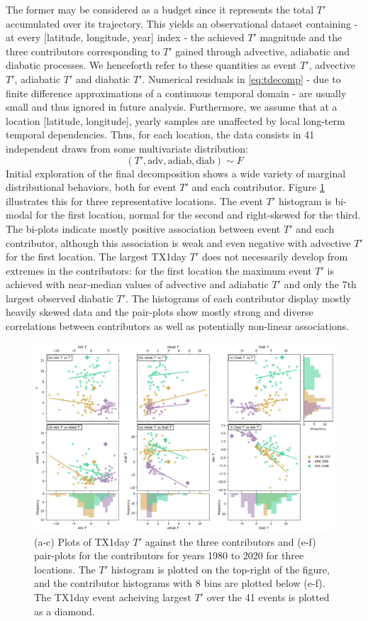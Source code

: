 \documentclass[11pt,a4paper,twoside,openright]{report}
\theoremstyle{definition}
\begin{document}
The former may be considered as a budget since it represents the total \(T'\) accumulated over its trajectory. This yields an observational dataset containing - at every {[}latitude, longitude, year{]} index - the achieved \(T'\) magnitude and the three contributors corresponding to \(T'\) gained through advective, adiabatic and diabatic processes. We henceforth refer to these quantities as event \(T'\), advective \(T'\), adiabatic \(T'\) and diabatic \(T'\). Numerical residuals in \eqref{eq:tdecomp} - due to finite difference approximations of a continuous temporal domain - are usually small and thus ignored in future analysis. Furthermore, we assume that at a location {[}latitude, longitude{]}, yearly samples are unaffected by local long-term temporal dependencies. Thus, for each location, the data consists in 41 independent draws from some multivariate distribution:
\[(T',\text{adv},\text{adiab},\text{diab}) \sim F \]
Initial exploration of the final decomposition shows a wide variety of marginal distributional behaviors, both for event \(T'\) and each contributor. Figure \ref{fig:flatdata} illustrates this for three representative locations. The event \(T'\) histogram is bi-modal for the first location, normal for the second and right-skewed for the third. The bi-plots indicate mostly positive association between event \(T'\) and each contributor, although this association is weak and even negative with advective \(T'\) for the first location. The largest TX1day \(T'\) does not necessarily develop from extremes in the contributors: for the first location the maximum event \(T'\) is achieved with near-median values of advective and adiabatic \(T'\) and only the 7th largest observed diabatic \(T'\). The histograms of each contributor display mostly heavily skewed data and the pair-plots show mostly strong and diverse correlations between contributors as well as potentially non-linear associations.

\begin{figure}[h]
\includegraphics[width=1\linewidth]{images/flat_data} \caption{(a-c) Plots of TX1day $T'$ against the three contributors and (e-f) pair-plots for the contributors for years 1980 to 2020 for three locations. The $T'$ histogram is plotted on the top-right of the figure, and the contributor histograms with 8 bins are plotted below (e-f). The TX1day event acheiving largest $T'$ over the 41 events is plotted as a diamond.}\label{fig:flatdata}
\end{figure}
\end{document}

